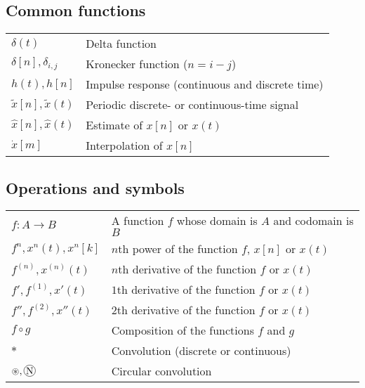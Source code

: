 \documentclass{article}
\newcommand*\circconv[1]{%
\tikz[baseline=(C.base)]\node[draw,circle,inner sep=0.5pt](C) {#1};\!
}
\begin{document}
\subsection{Common functions}
\begin{xltabular}{\textwidth}{XX}
    \(\delta(t)\) & Delta function\\
    \(\delta[n], \delta_{i,j}\) & Kronecker function (\(n = i-j\))\\
    \(h(t), h[n]\) & Impulse response (continuous and discrete time)\\
    \(\tilde{x}[n], \tilde{x}(t)\) & Periodic discrete- or continuous-time signal\\
    \(\hat{x}[n], \hat{x}(t)\) & Estimate of \(x[n]\) or \(x(t)\)\\
    \(\dot{x}[m]\) & Interpolation of \(x[n]\)\\
\end{xltabular}
\subsection{Operations and symbols}
\begin{xltabular}{\textwidth}{XX}
    \(f: A \rightarrow B\)& A function \(f\) whose domain is \(A\) and codomain is \(B\)\\
    \(f^{n}, x^{n}(t), x^{n}[k]\) & \(n\)th power of the function \(f\), \(x[n]\) or \(x(t)\)\\
    \(f^{\left( n \right)},  x^{(n)}(t)\) & \(n\)th derivative of the function \(f\) or \(x(t)\)\\
    \(f', f^{\left( 1 \right)}, x'(t)\) & \(1\)th derivative of the function \(f\) or \(x(t)\)\\
    \(f'', f^{\left( 2 \right)}, x''(t)\) & \(2\)th derivative of the function \(f\) or \(x(t)\)\\
    \(f \circ g\) & Composition of the functions \(f\) and \(g\)\\
    \(*\) & Convolution (discrete or continuous)\\
    \(\circledast, \circconv{N}\) & Circular convolution\\
\end{xltabular}
\end{document}
